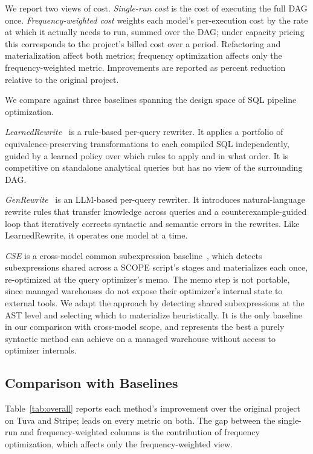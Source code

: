 We report two views of cost. \emph{Single-run cost} is the cost of executing the full DAG once. \emph{Frequency-weighted cost} weights each model's per-execution cost by the rate at which it actually needs to run, summed over the DAG; under capacity pricing this corresponds to the project's billed cost over a period. Refactoring and materialization affect both metrics; frequency optimization affects only the frequency-weighted metric. Improvements are reported as percent reduction relative to the original project.

We compare against three baselines spanning the design space of SQL pipeline optimization.

\emph{LearnedRewrite}~\cite{learnedrewrite} is a rule-based per-query rewriter. It applies a portfolio of equivalence-preserving transformations to each compiled SQL independently, guided by a learned policy over which rules to apply and in what order. It is competitive on standalone analytical queries but has no view of the surrounding DAG.

\emph{GenRewrite}~\cite{genrewrite} is an LLM-based per-query rewriter. It introduces natural-language rewrite rules that transfer knowledge across queries and a counterexample-guided loop that iteratively corrects syntactic and semantic errors in the rewrites. Like LearnedRewrite, it operates one model at a time.

\emph{CSE} is a cross-model common subexpression baseline~\cite{scopeCSE}, which detects subexpressions shared across a SCOPE script's stages and materializes each once, re-optimized at the query optimizer's memo. The memo step is not portable, since managed warehouses do not expose their optimizer's internal state to external tools. We adapt the approach by detecting shared subexpressions at the AST level and selecting which to materialize heuristically. It is the only baseline
in our comparison with cross-model scope, and represents the best a purely
syntactic method can achieve on a managed warehouse without access to
optimizer internals.









\subsection{Comparison with Baselines}
\label{sec:eval-baselines}

Table~\ref{tab:overall} reports each method's improvement over the original project on Tuva and Stripe; \tool{} leads on every metric on both. The gap between the single-run and frequency-weighted columns is the contribution of frequency optimization, which affects only the frequency-weighted view.

